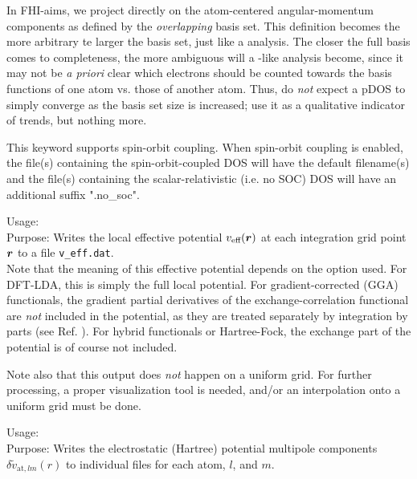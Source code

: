 In FHI-aims, we project directly on
the atom-centered angular-momentum components as defined by the
\emph{overlapping} basis set. This definition becomes the more arbitrary te
larger the basis set, just like a 
analysis. The closer the full basis comes to completeness, the
more ambiguous will a -like analysis become,
since it may not be \emph{a priori} clear which electrons should be counted
towards the basis functions of one atom vs. those of another atom. Thus, do
\emph{not} expect a pDOS to simply converge as the basis set size is
increased; use it as a qualitative indicator of trends, but nothing more.


This keyword supports spin-orbit coupling.  When spin-orbit coupling is
enabled, the file(s) containing the spin-orbit-coupled DOS will have the
default filename(s) and the file(s) containing the scalar-relativistic
(i.e. no SOC) DOS will have an additional suffix ".no\_soc".

{
  \noindent
  Usage:   \\[1.0ex]
  Purpose: Writes the local effective potential $v_\text{eff}(\mbox{\boldmath$r$})$
    at each integration grid point $\mbox{\boldmath$r$}$ to a file
    \texttt{v\_eff.dat}. \\[1.0ex]
}
Note that the meaning of this effective potential depends on the
 option used. For DFT-LDA, this is simply the full local
potential. For gradient-corrected (GGA) functionals, the gradient
partial derivatives of the exchange-correlation functional are
\emph{not} included in the potential, as they are treated separately
by integration by parts (see Ref. \cite{Blum08}). For hybrid
functionals or Hartree-Fock, the exchange part of the potential is of
course not included.

Note also that this output does \emph{not} happen on a uniform
grid. For further processing, a proper visualization tool is needed,
and/or an interpolation onto a uniform grid must be done.

{
  \noindent
  Usage:   \\[1.0ex]
  Purpose: Writes the electrostatic (Hartree) potential multipole
    components $\delta\tilde{v}_{\text{at},lm}(r)$ to individual files
    for each atom, $l$, and $m$. \\[1.0ex]
}

